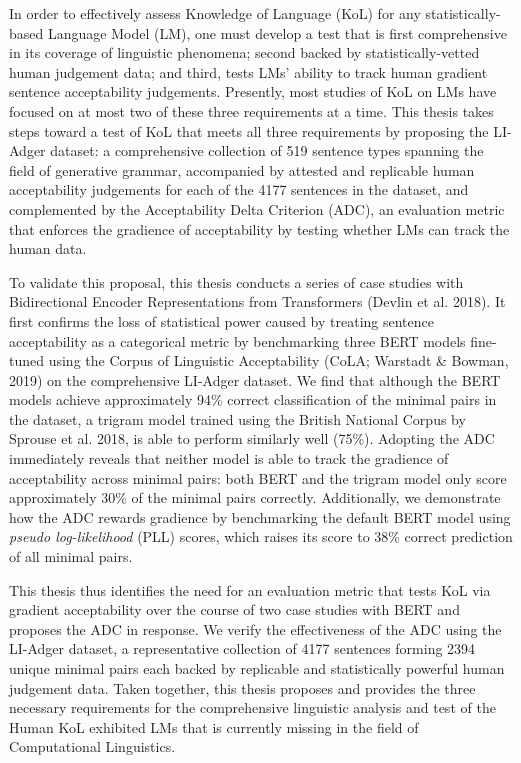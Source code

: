 % 
% 
%

In order to effectively assess Knowledge of Language (KoL) for any statistically-based Language Model (LM), one must develop a test that is first comprehensive in its coverage of linguistic phenomena; second backed by statistically-vetted human judgement data; and third, tests LMs' ability to track human gradient sentence acceptability judgements.  Presently, most studies of KoL on LMs have focused on at most two of these three requirements at a time.  This thesis takes steps toward a test of KoL that meets all three requirements by proposing the LI-Adger dataset: a comprehensive collection of 519 sentence types spanning the field of generative grammar, accompanied by attested and replicable human acceptability judgements for each of the 4177 sentences in the dataset, and complemented by the Acceptability Delta Criterion (ADC), an evaluation metric that enforces the gradience of acceptability by testing whether LMs can track the human data.

To validate this proposal, this thesis conducts a series of case studies with Bidirectional Encoder Representations from Transformers (Devlin et al. 2018).  It first confirms the loss of statistical power caused by treating sentence acceptability as a categorical metric by benchmarking three BERT models fine-tuned using the Corpus of Linguistic Acceptability (CoLA; Warstadt \& Bowman, 2019) on the comprehensive LI-Adger dataset.  We find that although the BERT models achieve approximately 94\% correct classification of the minimal pairs in the dataset, a trigram model trained using the British National Corpus by Sprouse et al. 2018, is able to perform similarly well (75\%).  Adopting the ADC immediately reveals that neither model is able to track the gradience of acceptability across minimal pairs: both BERT and the trigram model only score approximately 30\% of the minimal pairs correctly.  Additionally, we demonstrate how the ADC rewards gradience by benchmarking the default BERT model using \textit{pseudo log-likelihood} (PLL) scores, which raises its score to 38\% correct prediction of all minimal pairs.

This thesis thus identifies the need for an evaluation metric that tests KoL via gradient acceptability over the course of two case studies with BERT and proposes the ADC in response.  We verify the effectiveness of the ADC using the LI-Adger dataset, a representative collection of 4177 sentences forming 2394 unique minimal pairs each backed by replicable and statistically powerful human judgement data.  Taken together, this thesis proposes and provides the three necessary requirements for the comprehensive linguistic analysis and test of the Human KoL exhibited LMs that is currently missing in the field of Computational Linguistics.